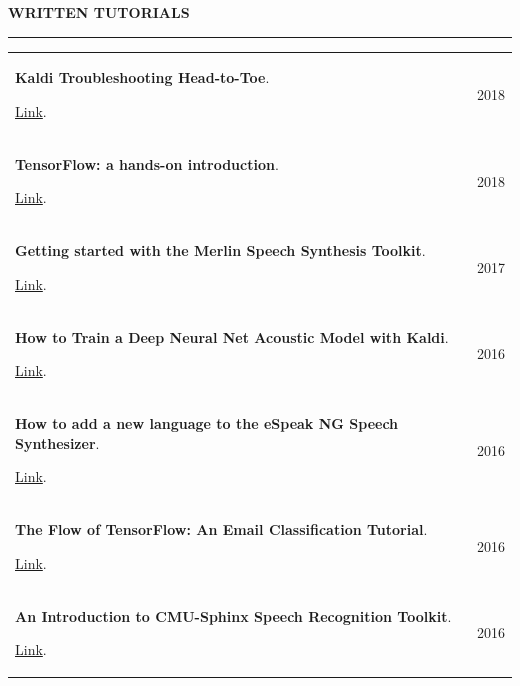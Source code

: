 \documentclass{cv} %
\begin{document}


\vspace{0.5cm}
\begin{minipage}{\textwidth}
\sectionskip
\MakeUppercase{\textbf{Written Tutorials}}
  \sectionlineskip
  \hrule
  \vspace{.5cm}
  
\renewcommand{\arraystretch}{1.5} %

\begin{tabular}{@{}p{}p{}@{}}
    {\bf Kaldi Troubleshooting Head-to-Toe}.
    
    \href{http://jrmeyer.github.io/asr/2019/08/17/Kaldi-troubleshooting.html}{Link}.
    &
    \hfill  {2018}
    \\
    {\bf TensorFlow: a hands-on introduction}.
    
    \href{http://jrmeyer.github.io/machinelearning/2019/05/29/tensorflow-dataset-estimator-api.html}{Link}.
    &
    \hfill {2018}
    \\
    {\bf Getting started with the Merlin Speech Synthesis Toolkit}.
    
    \href{http://jrmeyer.github.io/tts/2017/02/14/Installing-Merlin.html}{Link}.
    &
    \hfill {2017}
    \\
    {\bf How to Train a Deep Neural Net Acoustic Model with Kaldi}.
    
    \href{http://jrmeyer.github.io/asr/2016/12/15/DNN-AM-Kaldi.html}{Link}.
    &
    \hfill {2016}
    \\
    {\bf How to add a new language to the eSpeak NG Speech Synthesizer}.
    
    \href{http://jrmeyer.github.io/tts/2016/07/03/How-to-Add-a-Language-to-eSpeak-NG.html}{Link}.
    &
    \hfill {2016}
    \\
    {\bf The Flow of TensorFlow: An Email Classification Tutorial}.
    
    \href{http://jrmeyer.github.io/machinelearning/2016/02/01/TensorFlow-Tutorial.html}{Link}.
    &
    \hfill {2016}
    \\
    {\bf An Introduction to CMU-Sphinx Speech Recognition Toolkit}.
    
    \href{http://jrmeyer.github.io/asr/2016/01/09/Installing-CMU-Sphinx-on-Ubuntu.html}{Link}.
    &
    \hfill {2016}
    \\
\end{tabular}

\end{minipage}
\end{document}
